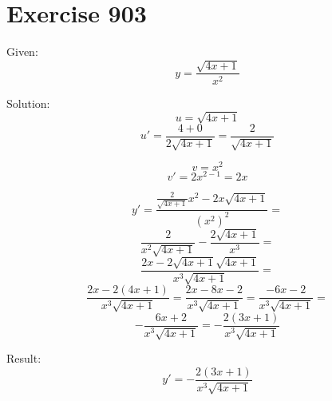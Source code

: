 \documentclass[a4paper, 10pt]{scrartcl}
\begin{document}
\section{Exercise 903}

Given:
\[
y = \frac{\sqrt{4x + 1}}{x^{2}}
\]

Solution:
\[
u = \sqrt{4x + 1}
\]
\[
u' = \frac{4 + 0}{2\sqrt{4x + 1}} = \frac{2}{\sqrt{4x + 1}}
\]

\[
v = x^{2}
\]
\[
v' = 2x^{2-1} = 2x
\]

\[
y' = \frac{\frac{2}{\sqrt{4x + 1}}x^{2} - 2x\sqrt{4x + 1}}{(x^{2})^{2}} =
\]
\[
\frac{2}{x^{2}\sqrt{4x + 1}} - \frac{2\sqrt{4x + 1}}{x^{3}} =
\]
\[
\frac{2x - 2\sqrt{4x + 1}\sqrt{4x + 1}}{x^{3}\sqrt{4x + 1}} =
\]
\[
\frac{2x - 2(4x + 1)}{x^{3}\sqrt{4x + 1}} = \frac{2x - 8x - 2}{x^{3}\sqrt{4x + 1}} = \frac{-6x - 2}{x^{3}\sqrt{4x + 1}} =
\]
\[
-\frac{6x + 2}{x^{3}\sqrt{4x + 1}} = -\frac{2(3x + 1)}{x^{3}\sqrt{4x + 1}}
\]

Result:
\[
y' = -\frac{2(3x + 1)}{x^{3}\sqrt{4x + 1}}
\]
\end{document}

